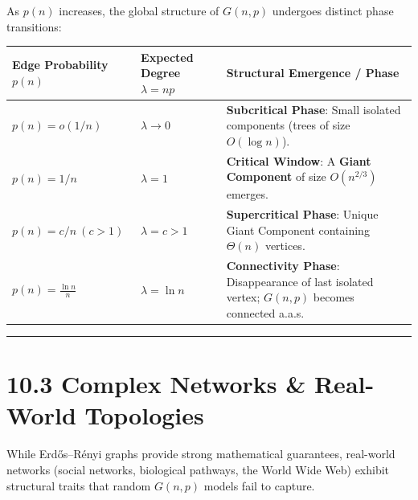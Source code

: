\documentclass[
]{book}
\newcounter{none} %
\theoremstyle{definition}
\theoremstyle{definition}
\theoremstyle{definition}
\theoremstyle{definition}
\theoremstyle{remark}
\begin{document}
As \(p(n)\) increases, the global structure of \(G(n, p)\) undergoes distinct phase transitions:

{\def\LTcaptype{none} %
\begin{longtable}[]{@{}
  >{\raggedright\arraybackslash}p{}
  >{\raggedright\arraybackslash}p{}
  >{\raggedright\arraybackslash}p{}@{}}
\toprule\noalign{}
\begin{minipage}[b]{\linewidth}\raggedright
Edge Probability \(p(n)\)
\end{minipage} & \begin{minipage}[b]{\linewidth}\raggedright
Expected Degree \(\lambda = np\)
\end{minipage} & \begin{minipage}[b]{\linewidth}\raggedright
Structural Emergence / Phase
\end{minipage} \\
\midrule\noalign{}
\endhead
\bottomrule\noalign{}
\endlastfoot
\(p(n) = o(1/n)\) & \(\lambda \to 0\) & \textbf{Subcritical Phase}: Small isolated components (trees of size \(O(\log n)\)). \\
\(p(n) = 1/n\) & \(\lambda = 1\) & \textbf{Critical Window}: A \textbf{Giant Component} of size \(O(n^{2/3})\) emerges. \\
\(p(n) = c/n \ (c > 1)\) & \(\lambda = c > 1\) & \textbf{Supercritical Phase}: Unique Giant Component containing \(\Theta(n)\) vertices. \\
\(p(n) = \frac{\ln n}{n}\) & \(\lambda = \ln n\) & \textbf{Connectivity Phase}: Disappearance of last isolated vertex; \(G(n, p)\) becomes connected a.a.s. \\
\end{longtable}
}

\begin{center}\rule{0.5\linewidth}{0.5pt}\end{center}

\section{10.3 Complex Networks \& Real-World Topologies}\label{complex-networks-real-world-topologies}

While Erdős--Rényi graphs provide strong mathematical guarantees, real-world networks (social networks, biological pathways, the World Wide Web) exhibit structural traits that random \(G(n, p)\) models fail to capture.
\end{document}

